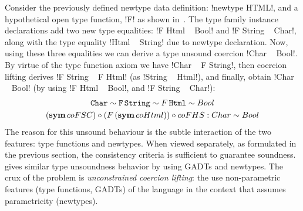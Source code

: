 \documentclass[screen,nonacm,manuscript,review]{acmart} %
\begin{document}
Consider the previously defined newtype data definition:
!newtype HTML!, and a hypothetical open type
function, !F! as shown in~.
The type family instance declarations add
two new type equalities: !F Html ~ Bool! and !F String ~ Char!,
along with the type equality !Html ~ String! due to newtype declaration.
Now, using these three equalities we can derive a type
unsound coercion !Char ~ Bool!. By virtue of the type
function axiom we have !Char ~ F String!, then coercion
lifting derives !F String ~ F Html! (as !String ~ Html!),
and finally, obtain !Char ~ Bool! (by using !F Html ~ Bool!, and !F String ~ Char!):
\begin{gather*}
\texttt{Char} \sim \texttt{F\,\texttt{String}} \sim F\,\texttt{Html} \sim Bool\\
{{(\textbf{sym}\,{c}oFSC)} \circ {(F\,(\textbf{sym}\,{coHtml}))}} \circ {coFHS} : Char \sim Bool
\end{gather*}
The reason for this unsound behaviour is the subtle interaction of
the two features: type functions and newtypes.
When viewed separately, as formulated in the previous section,
the consistency criteria is sufficient to guarantee soundness.
\citet{weirich_generative_2011} gives similar type unsoundness behavior
by using GADTs and newtypes. The crux of the problem is
\emph{unconstrained coercion lifting}: the use non-parametric
features (type functions, GADTs) of the language in the context that assumes
parametricity (newtypes).
\end{document}

